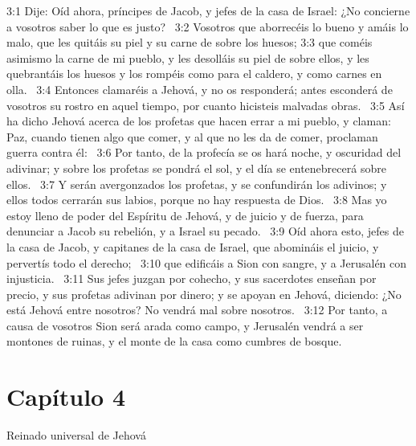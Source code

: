 3:1 Dije: Oíd ahora, príncipes de Jacob, y jefes de la casa de Israel: ¿No concierne a vosotros saber lo que es justo?  
3:2 Vosotros que aborrecéis lo bueno y amáis lo malo, que les quitáis su piel y su carne de sobre los huesos; 
3:3 que coméis asimismo la carne de mi pueblo, y les desolláis su piel de sobre ellos, y les quebrantáis los huesos y los rompéis como para el caldero, y como carnes en olla.  
3:4 Entonces clamaréis a Jehová, y no os responderá; antes esconderá de vosotros su rostro en aquel tiempo, por cuanto hicisteis malvadas obras.  
3:5 Así ha dicho Jehová acerca de los profetas que hacen errar a mi pueblo, y claman: Paz, cuando tienen algo que comer, y al que no les da de comer, proclaman guerra contra él:  
3:6 Por tanto, de la profecía se os hará noche, y oscuridad del adivinar; y sobre los profetas se pondrá el sol, y el día se entenebrecerá sobre ellos.  
3:7 Y serán avergonzados los profetas, y se confundirán los adivinos; y ellos todos cerrarán sus labios, porque no hay respuesta de Dios.  
3:8 Mas yo estoy lleno de poder del Espíritu de Jehová, y de juicio y de fuerza, para denunciar a Jacob su rebelión, y a Israel su pecado.  
3:9 Oíd ahora esto, jefes de la casa de Jacob, y capitanes de la casa de Israel, que abomináis el juicio, y pervertís todo el derecho;  
3:10 que edificáis a Sion con sangre, y a Jerusalén con injusticia.  
3:11 Sus jefes juzgan por cohecho, y sus sacerdotes enseñan por precio, y sus profetas adivinan por dinero; y se apoyan en Jehová, diciendo: ¿No está Jehová entre nosotros? No vendrá mal sobre nosotros.  
3:12 Por tanto, a causa de vosotros Sion será arada como campo, y Jerusalén vendrá a ser montones de ruinas, y el monte de la casa como cumbres de bosque. 
\section*{Capítulo 4 }
Reinado universal de Jehová  

